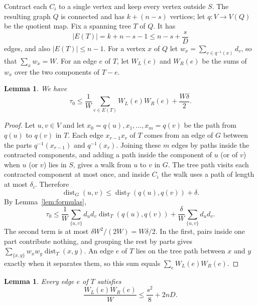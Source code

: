 \documentclass[11pt]{amsart}
\newtheorem{lemma}[theorem]{Lemma}
\theoremstyle{definition}
\theoremstyle{remark}
\numberwithin{equation}{section}
\DeclareMathOperator{\dist}{dist}
\begin{document}
Contract each $C_i$ to a single vertex and keep every vertex outside $S$. The resulting graph $Q$ is connected and has $k+(n-s)$ vertices; let $q:V\to V(Q)$ be the quotient map. Fix a spanning tree $T$ of $Q$. It has
\begin{equation}\label{eq:edges}
|E(T)|=k+n-s-1\le n-s+\frac sD
\end{equation}
edges, and also $|E(T)|\le n-1$. For a vertex $x$ of $Q$ let $w_x=\sum_{v\in q^{-1}(x)}d_v$, so that $\sum_xw_x=W$. For an edge $e$ of $T$, let $W_L(e)$ and $W_R(e)$ be the sums of $w_x$ over the two components of $T-e$.

\begin{lemma}\label{lem:tree}
We have
\[
\tau_0\le\frac1W\sum_{e\in E(T)}W_L(e)W_R(e)+\frac{W\delta}2 .
\]
\end{lemma}

\begin{proof}
Let $u,v\in V$ and let $x_0=q(u),x_1,\dots,x_m=q(v)$ be the path from $q(u)$ to $q(v)$ in $T$. Each edge $x_{r-1}x_r$ of $T$ comes from an edge of $G$ between the parts $q^{-1}(x_{r-1})$ and $q^{-1}(x_r)$. Joining these $m$ edges by paths inside the contracted components, and adding a path inside the component of $u$ (or of $v$) when $u$ (or $v$) lies in $S$, gives a walk from $u$ to $v$ in $G$. The tree path visits each contracted component at most once, and inside $C_i$ the walk uses a path of length at most $\delta_i$. Therefore
\[
\dist_G(u,v)\le\dist_T(q(u),q(v))+\delta .
\]
By Lemma~\ref{lem:formulas},
\[
\tau_0\le\frac1W\sum_{\{u,v\}}d_ud_v\dist_T(q(u),q(v))+\frac\delta W\sum_{\{u,v\}}d_ud_v .
\]
The second term is at most $\delta W^2/(2W)=W\delta/2$. In the first, pairs inside one part contribute nothing, and grouping the rest by parts gives $\sum_{\{x,y\}}w_xw_y\dist_T(x,y)$. An edge $e$ of $T$ lies on the tree path between $x$ and $y$ exactly when it separates them, so this sum equals $\sum_eW_L(e)W_R(e)$.
\end{proof}

\begin{lemma}\label{lem:cut}
Every edge $e$ of $T$ satisfies
\[
\frac{W_L(e)W_R(e)}W\le\frac{s^2}8+2nD .
\]
\end{lemma}
\end{document}
